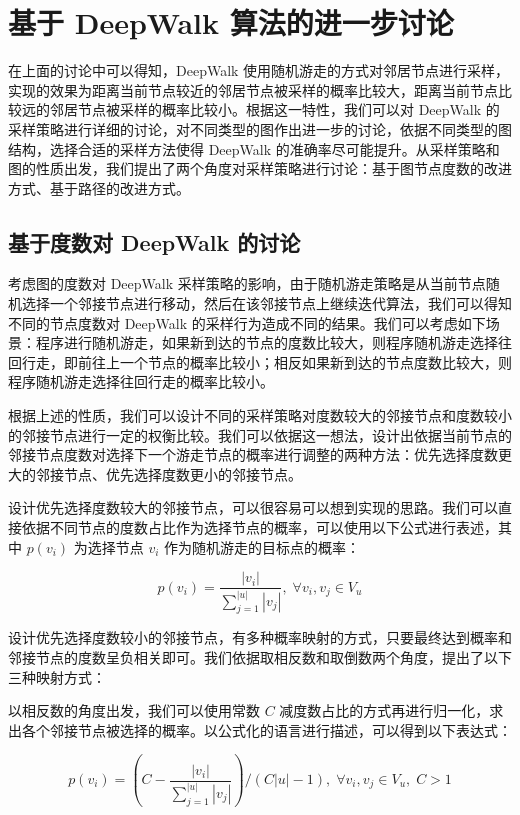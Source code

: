 \documentclass{ctexart}
\begin{document}
\section{基于 DeepWalk 算法的进一步讨论}

在上面的讨论中可以得知，DeepWalk 使用随机游走的方式对邻居节点进行采样，实现的效果为距离当前节点较近的邻居节点被采样的概率比较大，距离当前节点比较远的邻居节点被采样的概率比较小。根据这一特性，我们可以对 DeepWalk 的采样策略进行详细的讨论，对不同类型的图作出进一步的讨论，依据不同类型的图结构，选择合适的采样方法使得 DeepWalk 的准确率尽可能提升。从采样策略和图的性质出发，我们提出了两个角度对采样策略进行讨论：基于图节点度数的改进方式、基于路径的改进方式。

\subsection{基于度数对 DeepWalk 的讨论}

考虑图的度数对 DeepWalk 采样策略的影响，由于随机游走策略是从当前节点随机选择一个邻接节点进行移动，然后在该邻接节点上继续迭代算法，我们可以得知不同的节点度数对 DeepWalk 的采样行为造成不同的结果。我们可以考虑如下场景：程序进行随机游走，如果新到达的节点的度数比较大，则程序随机游走选择往回行走，即前往上一个节点的概率比较小；相反如果新到达的节点度数比较大，则程序随机游走选择往回行走的概率比较小。

根据上述的性质，我们可以设计不同的采样策略对度数较大的邻接节点和度数较小的邻接节点进行一定的权衡比较。我们可以依据这一想法，设计出依据当前节点的邻接节点度数对选择下一个游走节点的概率进行调整的两种方法：优先选择度数更大的邻接节点、优先选择度数更小的邻接节点。

设计优先选择度数较大的邻接节点，可以很容易可以想到实现的思路。我们可以直接依据不同节点的度数占比作为选择节点的概率，可以使用以下公式进行表述，其中 \(p(v_i)\) 为选择节点 \(v_i\) 作为随机游走的目标点的概率：

$$
p(v_i) = \frac{|v_i|}{\sum_{j=1}^{|u|} |v_j|}, \;\forall v_i, v_j \in V_u
$$

设计优先选择度数较小的邻接节点，有多种概率映射的方式，只要最终达到概率和邻接节点的度数呈负相关即可。我们依据取相反数和取倒数两个角度，提出了以下三种映射方式：

以相反数的角度出发，我们可以使用常数 \(C\) 减度数占比的方式再进行归一化，求出各个邻接节点被选择的概率。以公式化的语言进行描述，可以得到以下表达式：

$$
p(v_i) = \left(C - \frac{|v_i|}{\sum_{j=1}^{|u|} |v_j|}\right) / \left(C|u| - 1\right), \;\forall v_i, v_j \in V_u, \;C > 1
$$
\end{document}
